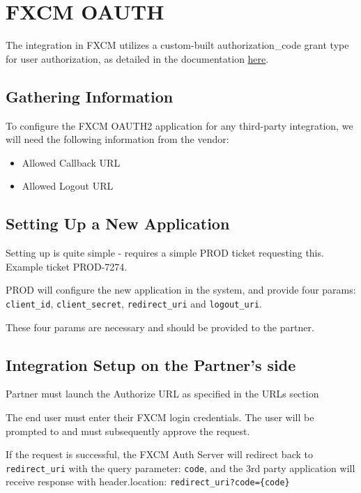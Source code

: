 \documentclass[11pt]{article}
\begin{document}
\newpage
\section{FXCM OAUTH}

The integration in FXCM utilizes a custom-built authorization\_code grant type for user authorization, as detailed in the documentation \href{https://datatracker.ietf.org/doc/html/draft-ietf-oauth-v2-1-01}{here}.

\subsection{Gathering Information}

To configure the FXCM OAUTH2 application for any third-party integration, we will need the following information from the vendor:

\begin{itemize}
    \item Allowed Callback URL
    \item Allowed Logout URL
\end{itemize}


\subsection{Setting Up a New Application}
Setting up is quite simple - requires a simple PROD ticket requesting this. Example ticket PROD-7274.

PROD will configure the new application in the system, and provide four params: \verb|client_id|, \verb|client_secret|, \verb|redirect_uri| and \verb|logout_uri|.

These four params are necessary and should be provided to the partner.

\subsection{Integration Setup on the Partner's side}

Partner must launch the Authorize URL as specified in the URLs section

The end user must enter their FXCM login credentials. The user will be prompted to and must subsequently approve the request.

If the request is successful, the FXCM Auth Server will redirect back to \verb|redirect_uri| with the query parameter: \verb|code|, and the	3rd party application will receive response with header.location: \verb|redirect_uri?code={code}|
\end{document}
